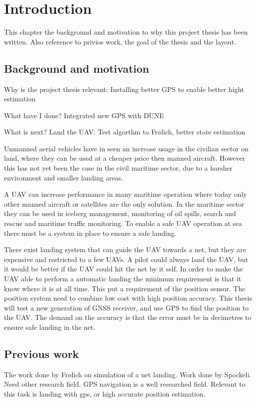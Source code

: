 
\chapter{Introduction}
This chapter the background and motivation to why this project thesis has been written. Also reference to privios work, the goal of the thesis and the layout.
\section{Background and motivation}
Why is the project thesis relevant: Installing better GPS to enable better hight estimation

What have I done? Integrated new GPS with DUNE

What is next? Land the UAV. Test algorthm to Frølich, better state estimation 

Unmanned aerial vehicles have in seen an increase usage in the civilian sector on land, where they can be used at a cheaper price then manned aircraft. However this has not yet been the case in the civil maritime sector, due to a harsher environment and smaller landing areas.

A UAV can increase performance in many maritime operation where today only other manned aircraft or satellites are the only solution. In the maritime sector they can be used in iceberg management, monitoring of oil spills, search and rescue and maritime traffic monitoring. To enable a safe UAV operation at sea there must be a system in place to ensure a safe landing.

There exist landing system that can guide the UAV towards a net, but they are expensive and restricted to a few UAVs. A pilot could always land the UAV, but it would be better if the UAV could hit the net by it self. In order to make the UAV able to perform a automatic landing the minimum requirement is that it know where it is at all time. This put a requirement of the position sensor. The position system need to combine low cost with high position accuracy. This thesis will test a new generation of GNSS receiver, and use GPS to find the position to the UAV. The demand on the accuracy is that the error must be in decimetres to ensure safe landing in the net.


\section{Previous work}
The work done by Frølich on simulation of a net landing. Work done by Spockeli. Need other research field. GPS navigation is a well researched field. Relevant to this task is landing with gps, or high accurate position estimation. 

